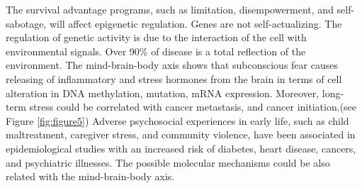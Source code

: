 \documentclass[jpm,article,submit,moreauthors,pdftex]{Definitions/mdpi}
\begin{document}
\begin{paracol}{2}
The survival advantage programs, such as limitation, disempowerment, and self-sabotage, will affect epigenetic regulation.
Genes are not self-actualizing. %
The regulation of genetic activity is due to the interaction of the cell with environmental signals.
Over 90\% of disease is a total reflection of the environment.%
The mind-brain-body axis shows that subconscious fear causes releasing of inflammatory and stress hormones from the brain in terms of cell alteration in DNA methylation, mutation, mRNA expression. 
Moreover, long-term stress could be correlated with cancer metastasis\cite{Lutgendorf2010}\cite{Moreno-Smith2010}\cite{Du2020}\cite{Xu2021},
and cancer initiation\cite{Lutgendorf2010}\cite{Powell2013}\cite{Iftikhar2021}.(see Figure \ref{fig:figure5}) %
Adverse psychosocial experiences in early life, such as child maltreatment, caregiver stress, and community violence, have been associated in epidemiological studies with an increased risk of diabetes, heart disease, cancers, and psychiatric illnesses. 
The possible molecular mechanisms could be also related with the mind-brain-body axis\cite{Berens2017}.


\end{paracol}
\end{document}
